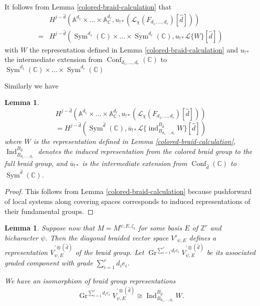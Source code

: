 \documentclass[11pt,letterpaper]{article}
\newtheorem{lemma}[theorem]{Lemma}
\theoremstyle{definition}
\theoremstyle{remark}
\numberwithin{equation}{section}
\theoremstyle{dotless}
\newcommand{\Gr}{\operatorname{Gr}}
\newcommand{\hchi}{\psi} %
\newcommand{\gene}{\zeta_1} %
\begin{document}
It follows from Lemma \ref{colored-braid-calculation} that
\begin{equation}\label{0-to-top} \begin{aligned}  &H^{j-\hat{d}} ( \mathbb A^{d_1 } \times \dots \times \mathbb A^{d_r }_{\mathbb C},   {u} _{!*}   (\mathcal L_{\chi}(F_{d_1,\dots,d_r}) [\hat{d}])) \\ =& H^{j-\hat{d}}  ( \operatorname{Sym}^{d_1} (\mathbb C) \times \dots \times \operatorname{Sym}^{d_r}(\mathbb C), u_{!*} \mathcal L\{W\} [\hat{d}]  ) \end{aligned} \end{equation} with $W$ the representation defined in Lemma \ref{colored-braid-calculation} and $u_{!*}$ the intermediate extension from $\operatorname{Conf}_{d_1,\dots, d_r}(\mathbb C)$ to $ \operatorname{Sym}^{d_1} (\mathbb C) \times \dots \times \operatorname{Sym}^{d_r}(\mathbb C)$

Similarly we have
\begin{lemma}\label{zero-to-top} \[ H^{j-\hat{d}} ( \mathbb A^{d_1 } \times \dots \times \mathbb A^{d_r }_{\mathbb C},   {u} _{!*}   (\mathcal L_{\chi}(F_{d_1,\dots,d_r}) [\hat{d}]))\] \[ = H^{j-\hat{d}}  ( \operatorname{Sym}^{\hat{d} } (\mathbb C),  \overline{u}_{!*} \mathcal L\{\operatorname{ind}_{B_{d_1,\dots,d_r}}^{B_{\hat{d}}} W\} [\hat{d}])  \] where $W$ is the representation defined in Lemma \ref{colored-braid-calculation}, $\operatorname{Ind}_{B_{d_1,\dots,d_r}}^{B_{\hat{d}}}$  denotes the induced representation from the colored braid group to the full braid group, and $\overline{u}_{!*}$ is the intermediate extension from $\operatorname{Conf}_{\hat{d}}(\mathbb C)$ to $\operatorname{Sym}^{\hat{d} } (\mathbb C)$. \end{lemma}
\begin{proof} This follows from Lemma \ref{colored-braid-calculation} because pushforward of local systems along covering spaces corresponds to induced representations of their fundamental groups. \end{proof}


\begin{lemma}\label{representation-isomorphism} Suppose now that $M = M^{ \hchi,E,\gene}$ for some basis $E$ of $\mathbb Z^r$ and bicharacter $\hchi$. Then the diagonal braided vector space $V'_{\hchi,E}$ defines a representation $V^{ '\otimes (\hat{d})}_{\hchi ,E} $ of the braid group. Let $ \Gr^{ \sum_{i=1}^r d_i e_i} V^{ '\otimes (\hat{d})}_{\hchi ,E}$ be its associated graded component with grade $\sum_{i=1}^r d_i e_i$.

We have an isomorphism of braid group representations
\[  \Gr^{ \sum_{i=1}^r d_i e_i} V^{ '\otimes (\hat{d})}_{\hchi ,E} \cong  \operatorname{Ind}_{B_{d_1,\dots,d_r}}^{B_{\hat{d}}} W. \] \end{lemma}
\end{document}
